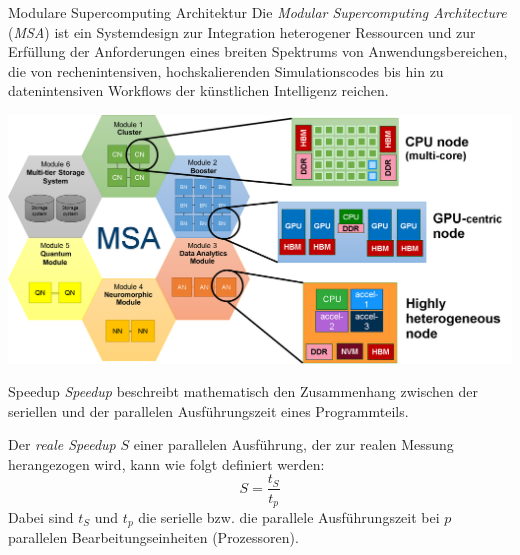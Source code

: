 \begin{jsc}{Modulare Supercomputing Architektur}
    Die \emph{Modular Supercomputing Architecture} (\emph{MSA}) ist ein Systemdesign zur Integration heterogener Ressourcen und zur Erfüllung der Anforderungen eines breiten Spektrums von Anwendungsbereichen, die von rechenintensiven, hochskalierenden Simulationscodes bis hin zu datenintensiven Workflows der künstlichen Intelligenz reichen.
    
    \vspace{1em}
    
    \centering
    \includegraphics[width=0.9\linewidth]{images/modular_supercomputing_architecture.png}
\end{jsc}

\begin{defi}{Speedup}
    \emph{Speedup} beschreibt mathematisch den Zusammenhang zwischen der seriellen und der parallelen Ausführungszeit eines Programmteils.
    
    Der \emph{reale Speedup} $S$ einer parallelen Ausführung, der zur realen Messung herangezogen wird, kann wie folgt definiert werden:
    \[
        S = \frac{t_S}{t_p}
    \]
    Dabei sind $t_S$ und $t_p$ die serielle bzw. die parallele Ausführungszeit bei $p$ parallelen Bearbeitungseinheiten (Prozessoren).
\end{defi}

